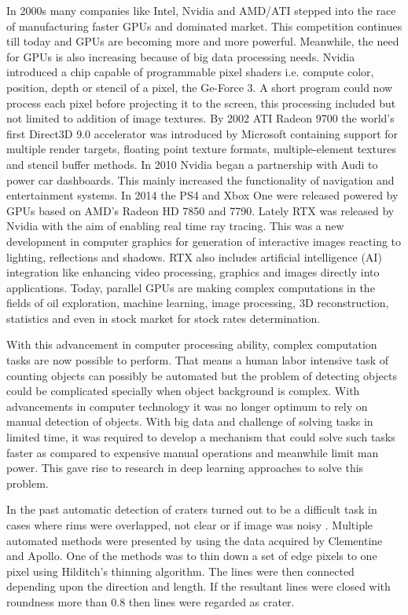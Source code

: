 \documentclass[11pt]{article}
\begin{document}
In 2000s many companies like Intel, Nvidia and AMD/ATI stepped into the race of manufacturing faster GPUs and dominated market. This competition continues till today and GPUs are becoming more and more powerful. Meanwhile, the need for GPUs is also increasing because of big data processing needs. Nvidia introduced a chip capable of programmable pixel shaders i.e. compute color, position, depth or stencil of a pixel, the Ge-Force 3. A short program could now process each pixel before projecting it to the screen, this processing included but not limited to addition of image textures. By 2002 ATI Radeon 9700 the world's first Direct3D 9.0 accelerator was introduced by Microsoft containing support for multiple render targets, floating point texture formats, multiple-element textures and stencil buffer methods. In 2010 Nvidia began a partnership with Audi to power car dashboards. This mainly increased the functionality of navigation and entertainment systems. In 2014 the PS4 and Xbox One were released powered by GPUs based on AMD's Radeon HD 7850 and 7790. Lately RTX was released by Nvidia with the aim of enabling real time ray tracing. This was a new development in computer graphics for generation of interactive images reacting to lighting, reflections and shadows. RTX also includes artificial intelligence (AI) integration like enhancing video processing, graphics and images directly into applications. Today, parallel GPUs are making complex computations in the fields of oil exploration, machine learning, image processing, 3D reconstruction, statistics and even in stock market for stock rates determination.

With this advancement in computer processing ability, complex computation tasks are now possible to perform. That means a human labor intensive task of counting objects can possibly be automated but the problem of detecting objects could be complicated specially when object background is complex. With advancements in computer technology it was no longer optimum to rely on manual detection of objects. With big data and challenge of solving tasks in limited time, it was required to develop a mechanism that could solve such tasks faster as compared to expensive manual operations and meanwhile limit man power. This gave rise to research in deep learning approaches to solve this problem.

In the past automatic detection of craters turned out to be a difficult task in cases where rims were overlapped, not clear or if image was noisy \cite{sawabe_2006}. Multiple automated methods were presented by \cite{sawabe_2006} using the data acquired by Clementine and Apollo. One of the methods was to thin down a set of edge pixels to one pixel using Hilditch's thinning algorithm. The lines were then connected depending upon the direction and length. If the resultant lines were closed with roundness more than 0.8 then lines were regarded as crater. 
\end{document}
